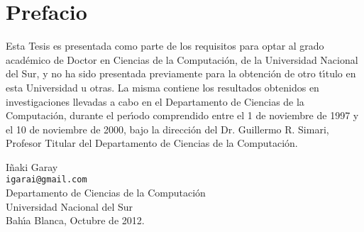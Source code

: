 \chapter*{Prefacio}

Esta Tesis es presentada como parte de los requisitos para optar
al grado acad\'emico de Doctor en Ciencias de la Computaci\'on,
de la Universidad Nacional del Sur, y no ha sido presentada previamente
para la obtenci\'on de otro t\'{\i}tulo en esta Universidad u otras.
La misma contiene los resultados obtenidos en
investigaciones llevadas a cabo en el
Departamento de Ciencias de la Computaci\'on, 
durante el per\'\i odo comprendido entre 
el 1 de noviembre de 1997 y el 10 de noviembre de 2000, 
bajo la direcci\'on del Dr. Guillermo R. Simari, Profesor
Titular del Departamento de Ciencias de la Computaci\'on.

\vspace{5cm}

\begin{flushright}
I\~{n}aki Garay \\
{\small \tt igarai@gmail.com} \\
{\sc Departamento de Ciencias de la Computaci\'on \\
Universidad Nacional del Sur }\\
Bah\'{\i}a Blanca, Octubre de 2012. \\
\end{flushright}
